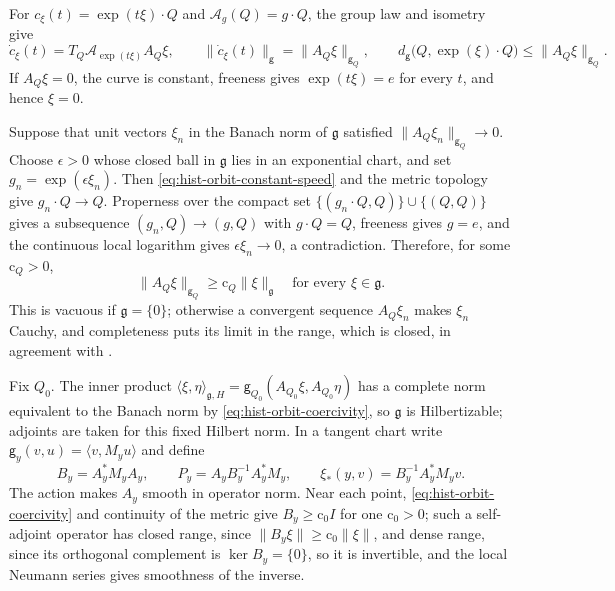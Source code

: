 For \(c_\xi(t)=\exp(t\xi)\cdot Q\) and \(\mathscr A_g(Q)=g\cdot Q\), the group law
and isometry give
\begin{equation}
\dot c_\xi(t)=T_Q\mathscr A_{\exp(t\xi)}A_Q\xi,
\qquad
\|\dot c_\xi(t)\|_{\mathsf g}=\|A_Q\xi\|_{\mathsf g_Q},
\qquad
d_{\mathsf g}\bigl(Q,\exp(\xi)\cdot Q\bigr)\leq\|A_Q\xi\|_{\mathsf g_Q}.
\label{eq:hist-orbit-constant-speed}
\end{equation}
If \(A_Q\xi=0\), the curve is constant, freeness gives \(\exp(t\xi)=e\) for
every \(t\), and hence \(\xi=0\).

Suppose that unit vectors \(\xi_n\) in the Banach norm of \(\mathfrak g\) satisfied
\(\|A_Q\xi_n\|_{\mathsf g_Q}\to0\). Choose \(\epsilon>0\) whose closed ball in
\(\mathfrak g\) lies in an exponential chart, and set \(g_n=\exp(\epsilon\xi_n)\).
Then \eqref{eq:hist-orbit-constant-speed} and the metric topology give
\(g_n\cdot Q\to Q\). Properness over the compact set
\(\{(g_n\cdot Q,Q)\}\cup\{(Q,Q)\}\) gives a subsequence \((g_n,Q)\to(g,Q)\) with
\(g\cdot Q=Q\), freeness gives \(g=e\), and the continuous local logarithm gives
\(\epsilon\xi_n\to0\), a contradiction. Therefore, for some
\(\mathrm c_Q>0\),
\begin{equation}
\|A_Q\xi\|_{\mathsf g_Q}\geq\mathrm c_Q\|\xi\|_{\mathfrak g}
\quad\text{for every }\xi\in\mathfrak g.
\label{eq:hist-orbit-coercivity}
\end{equation}
This is vacuous if \(\mathfrak g=\{0\}\); otherwise a convergent sequence
\(A_Q\xi_n\) makes \(\xi_n\) Cauchy, and completeness puts its limit in the range,
which is closed, in agreement with \citet[Theorem~2.1]{JotzNeeb2008}.

Fix \(Q_0\). The inner product
\(\langle\xi,\eta\rangle_{\mathfrak g,H}=\mathsf g_{Q_0}(A_{Q_0}\xi,A_{Q_0}\eta)\)
has a complete norm equivalent to the Banach norm by
\eqref{eq:hist-orbit-coercivity}, so \(\mathfrak g\) is Hilbertizable; adjoints
are taken for this fixed Hilbert norm. In a tangent chart write
\(\mathsf g_y(v,u)=\langle v,M_yu\rangle\) and define
\begin{equation}
B_y=A_y^*M_yA_y,
\qquad
P_y=A_yB_y^{-1}A_y^*M_y,
\qquad
\xi_*(y,v)=B_y^{-1}A_y^*M_yv.
\label{eq:hist-smooth-orbit-projection}
\end{equation}
The action makes \(A_y\) smooth in operator norm. Near each point,
\eqref{eq:hist-orbit-coercivity} and continuity of the metric give
\(B_y\geq\mathrm c_0I\) for one \(\mathrm c_0>0\); such a self-adjoint operator
has closed range, since \(\|B_y\xi\|\geq\mathrm c_0\|\xi\|\), and dense range,
since its orthogonal complement is \(\ker B_y=\{0\}\), so it is invertible, and
the local Neumann series gives smoothness of the inverse.

